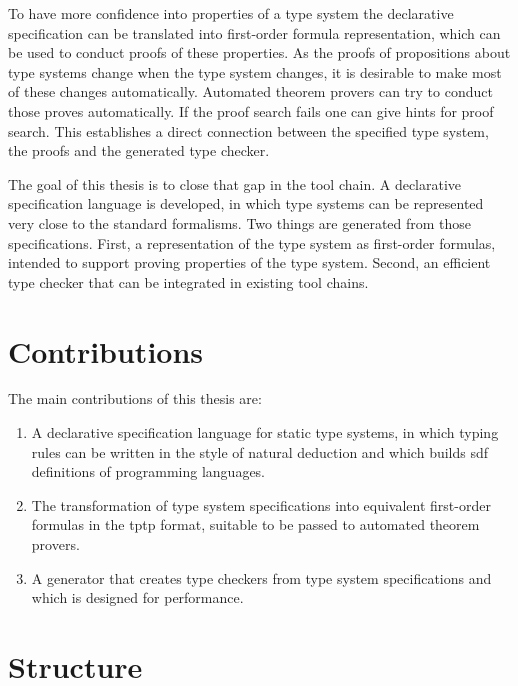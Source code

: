 To have more confidence into properties of a type system the
declarative specification can be translated into first-order formula
representation, which can be used to conduct proofs of these
properties. As the proofs of propositions about type systems change
when the type system changes, it is desirable to make most of these
changes automatically. Automated theorem provers can try to conduct
those proves automatically. If the proof search fails one can give
hints for proof search. This establishes a direct connection between
the specified type system, the proofs and the generated type checker.

The goal of this thesis is to close that gap in the tool chain. A
declarative specification language is developed, in which type systems
can be represented very close to the standard formalisms. Two things
are generated from those specifications. First, a representation of
the type system as first-order formulas, intended to support proving
properties of the type system. Second, an efficient type checker that
can be integrated in existing tool chains.
\section{Contributions}
The main contributions of this thesis are:
\begin{enumerate}
\item A declarative specification language for static type systems, in
  which typing rules can be written in the style of natural deduction
  and which builds \gls{sdf} definitions of programming languages.
\item The transformation of type system specifications into equivalent
  first-order formulas in the \gls{tptp} format, suitable to be passed to
  automated theorem provers.
\item A generator that creates type checkers from type system
  specifications and which is designed for performance.
\end{enumerate}

\section{Structure}

